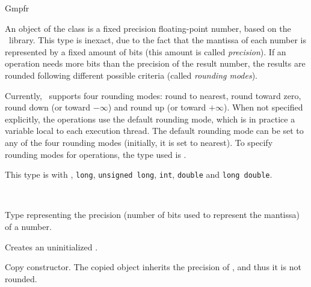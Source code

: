 \begin{ccRefClass} {Gmpfr}
\label{Gmpfr}

\ccDefinition

An object of the class  is a fixed precision floating-point
number, based on the \mpfr\ library. This type is inexact, due to the fact
that the mantissa of each number is represented by a fixed amount of bits
(this amount is called \emph{precision}). If an operation needs more bits
than the precision of the result number, the results are rounded following
different possible criteria (called \emph{rounding modes}).

Currently, \mpfr\ supports four rounding modes: round to nearest,
round toward zero, round down (or toward \(-\infty\)) and round up
(or toward \(+\infty\)).  When not specified explicitly, the
operations use the default rounding mode, which is in practice a
variable local to each execution thread. The default rounding mode
can be set to any of the four rounding modes (initially, it is set
to nearest). To specify rounding modes for operations, the type
used is .

This type is  with , \verb-long-,
\verb-unsigned long-, \verb-int-, \verb-double- and \verb-long double-.


\ccIsModel
{}\\

\ccTypes

                {Type representing the precision (number of bits
                used to represent the mantissa) of a number.}

\ccCreation
{}

        {Creates an uninitialized  \ccVar.}

        {Copy constructor. The copied object inherits the precision of
        , and thus it is not rounded.}



\end{ccRefClass}
